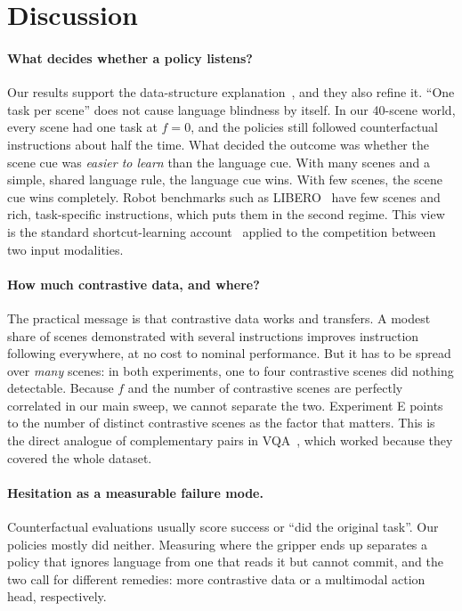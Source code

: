 \documentclass[11pt]{article}
\begin{document}
\section{Discussion}
\paragraph{What decides whether a policy listens?}
Our results support the data-structure explanation~\citep{fang2026vision,jiang2026encoded}, and
they also refine it. ``One task per scene'' does not cause language blindness by itself. In our
40-scene world, every scene had one task at $f{=}0$, and the policies still followed
counterfactual instructions about half the time. What decided the outcome was whether the scene
cue was \emph{easier to learn} than the language cue. With many scenes and a simple, shared
language rule, the language cue wins. With few scenes, the scene cue wins completely. Robot
benchmarks such as LIBERO~\citep{liu2023libero} have few scenes and rich, task-specific
instructions, which puts them in the second regime. This view is the standard shortcut-learning
account~\citep{geirhos2020shortcut} applied to the competition between two input modalities.

\paragraph{How much contrastive data, and where?}
The practical message is that contrastive data works and transfers. A modest share of scenes
demonstrated with several instructions improves instruction following everywhere, at no cost to
nominal performance. But it has to be spread over \emph{many} scenes: in both experiments, one to
four contrastive scenes did nothing detectable. Because $f$ and the number of contrastive scenes
are perfectly correlated in our main sweep, we cannot separate the two. Experiment E points to the
number of distinct contrastive scenes as the factor that matters. This is the direct analogue of
complementary pairs in VQA~\citep{goyal2017vqa}, which worked because they covered the whole dataset.

\paragraph{Hesitation as a measurable failure mode.}
Counterfactual evaluations usually score success or ``did the original task''. Our policies
mostly did neither. Measuring where the gripper ends up separates a policy that ignores language
from one that reads it but cannot commit, and the two call for different remedies: more
contrastive data or a multimodal action head, respectively.
\end{document}

